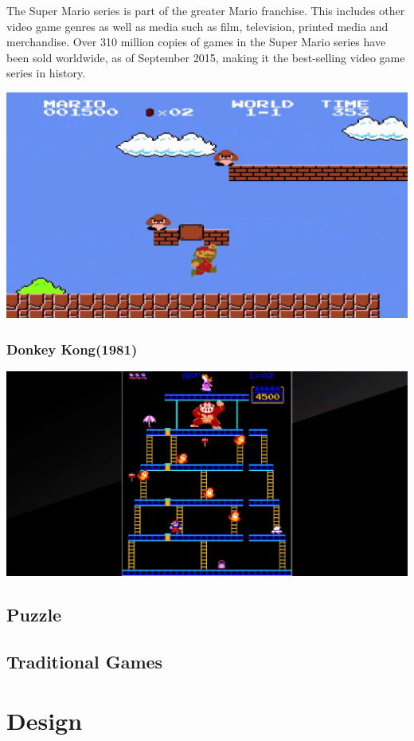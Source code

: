 \documentclass{article}
\begin{document}
The Super Mario series is part of the greater Mario franchise. This includes other video game genres as well as media such as film, television, printed media and merchandise. Over 310 million copies of games in the Super Mario series have been sold worldwide, as of September 2015, making it the best-selling video game series in history.

\includegraphics [scale=0.3]{mario}
\clearpage

\subsubsection{Donkey Kong(1981)}
\includegraphics [scale=0.12]{donkeykong}
\clearpage
			
\subsection{Puzzle}
\subsection{Traditional Games}
	
\section{Design}
\end{document}
